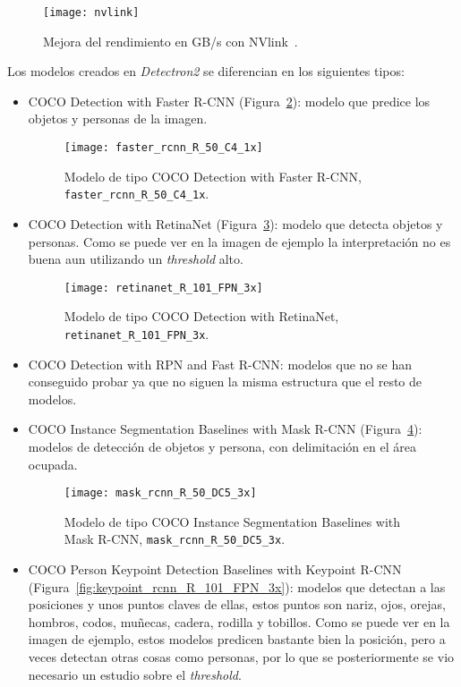 {\begin{figure}[h]
	\centering
	\texttt{[image: nvlink]}
	\caption{Mejora del rendimiento en GB/s con NVlink~\cite{nvlink}.}
	\label{fig:nvlink}
\end{figure}

Los modelos creados en \textit{Detectron2} se diferencian en los siguientes tipos:
\begin{itemize}
	\item COCO Detection with Faster R-CNN (Figura~\ref{fig:faster_rcnn_R_50_C4_1x}): modelo que predice los objetos y personas de la imagen.
	\begin{figure}[h]
		\centering
		\texttt{[image: faster\_rcnn\_R\_50\_C4\_1x]}
		\caption{Modelo de tipo COCO Detection with Faster R-CNN, \texttt{faster\_rcnn\_R\_50\_C4\_1x}.}
		\label{fig:faster_rcnn_R_50_C4_1x}
	\end{figure}
	\item COCO Detection with RetinaNet (Figura~\ref{fig:retinanet_R_101_FPN_3x}): modelo que detecta objetos y personas. Como se puede ver en la imagen de ejemplo la interpretación no es buena aun utilizando un \textit{threshold} alto.
	\begin{figure}[h]
		\centering
		\texttt{[image: retinanet\_R\_101\_FPN\_3x]}
		\caption{Modelo de tipo COCO Detection with RetinaNet, \texttt{retinanet\_R\_101\_FPN\_3x}.}
		\label{fig:retinanet_R_101_FPN_3x}
	\end{figure}
	\item COCO Detection with RPN and Fast R-CNN: modelos que no se han conseguido probar ya que no siguen la misma estructura que el resto de modelos.
	\item COCO Instance Segmentation Baselines with Mask R-CNN (Figura~\ref{fig:mask_rcnn_R_50_DC5_3x}): modelos de detección de objetos y persona, con delimitación en el área ocupada.
	\begin{figure}[h]
		\centering
		\texttt{[image: mask\_rcnn\_R\_50\_DC5\_3x]}
		\caption{Modelo de tipo COCO Instance Segmentation Baselines with Mask R-CNN, \texttt{mask\_rcnn\_R\_50\_DC5\_3x}.}
		\label{fig:mask_rcnn_R_50_DC5_3x}
	\end{figure}
	\item COCO Person Keypoint Detection Baselines with Keypoint R-CNN (Figura~\ref{fig:keypoint_rcnn_R_101_FPN_3x}): modelos que detectan a las posiciones y unos puntos claves de ellas, estos puntos son nariz, ojos, orejas, hombros, codos, muñecas, cadera, rodilla y tobillos. Como se puede ver en la imagen de ejemplo, estos modelos predicen bastante bien la posición, pero a veces detectan otras cosas como personas, por lo que se posteriormente se vio necesario un estudio sobre el \textit{threshold}.

\end{itemize}}
